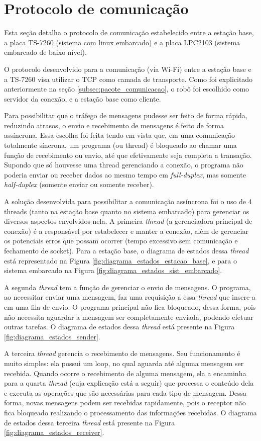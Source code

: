 \section{Protocolo de comunicação}

Esta seção detalha o protocolo de comunicação estabelecido entre a estação base, a placa TS-7260 (sistema com linux embarcado) e a placa LPC2103 (sistema embarcado de baixo nível).

O protocolo desenvolvido para a comunicação (via Wi-Fi) entre a estação base e a TS-7260 visa utilizar o TCP como camada de transporte. Como foi explicitado anteriormente na seção \ref{subsec:pacote_comunicacao}, o robô foi escolhido como servidor da conexão, e a estação base como cliente.

Para possibilitar que o tráfego de mensagens pudesse ser feito de forma rápida, reduzindo atrasos, o envio e recebimento de mensagens é feito de forma assíncrona.
Essa escolha foi feita tendo em vista que, em uma comunicação totalmente síncrona, um programa (ou thread) é bloqueado ao chamar uma função de recebimento ou envio, até que efetivamente seja completa a transação. Supondo que só houvesse uma thread gerenciando a conexão, o programa não poderia enviar ou receber dados ao mesmo tempo em \textit{full-duplex}, mas somente \textit{half-duplex} (somente enviar ou somente receber).

A solução desenvolvida para possibilitar a comunicação assíncrona foi o uso de 4 threads (tanto na estação base quanto no sistema embarcado) para gerenciar os diversos aspectos envolvidos nela. A primeira \textit{thread} (a gerenciadora principal de conexão) é a responsável por estabelecer e manter a conexão, além de gerenciar os potenciais erros que possam ocorrer (tempo excessivo sem comunicação e fechamento de socket). Para a estação base, o diagrama de estados dessa \textit{thread} está representado na Figura \ref{fig:diagrama_estados_estacao_base}, e para o sistema embarcado na Figura \ref{fig:diagrama_estados_sist_embarcado}.

A segunda \textit{thread} tem a função de gerenciar o envio de mensagens. O programa, ao necessitar enviar uma mensagem, faz uma requisição a essa \textit{thread} que insere-a em uma fila de envio. O programa principal não fica bloqueado, dessa forma, pois não necessita aguardar a mensagem ser completamente enviada, podendo efetuar outras tarefas. O diagrama de estados dessa \textit{thread} está presente na Figura \ref{fig:diagrama_estados_sender}.

A terceira \textit{thread} gerencia o recebimento de mensagens. Seu funcionamento é muito simples: ela possui um loop, no qual aguarda até alguma mensagem ser recebida. Quando ocorre o recebimento de alguma mensagem, ela a encaminha para a quarta \textit{thread} (cuja explicação está a seguir) que processa o conteúdo dela e executa as operações que são necessárias para cada tipo de mensagem. Dessa forma, novas mensagens podem ser recebidas rapidamente, pois o receptor não fica bloqueado realizando o processamento das informações recebidas. O diagrama de estados dessa terceira \textit{thread} está presente na Figura \ref{fig:diagrama_estados_receiver}.

